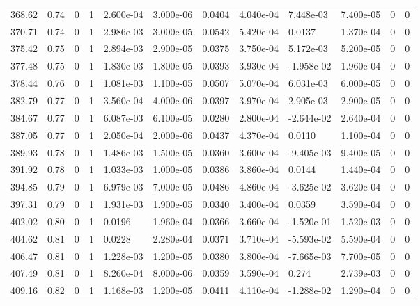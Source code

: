 \documentclass[preview]{standalone}
\begin{document}
{{{{{{{{{{{{{{{\begin{tabular}{L{1.2cm}C{1.2cm} C{0.3cm}C{0.5cm} C{1.4cm}C{1.4cm} C{1.4cm}C{1.4cm} C{1.6cm}C{1.6cm} C{1.6cm}C{1.6cm}}
  368.62  &  0.74  & 0     &  1 &  2.600e-04  & 3.000e-06  &  0.0404&   4.040e-04& 7.448e-03 & 7.400e-05   &  0 & 0  \\ 
  370.71  &  0.74  & 0     &  1 &  2.986e-03  & 3.000e-05  &  0.0542&   5.420e-04& 0.0137 & 1.370e-04   &  0 & 0  \\ 
  375.42  &  0.75  & 0     &  1 &  2.894e-03  & 2.900e-05  &  0.0375&   3.750e-04& 5.172e-03 & 5.200e-05   &  0 & 0  \\ 
  377.48  &  0.75  & 0     &  1 &  1.830e-03  & 1.800e-05  &  0.0393&   3.930e-04& -1.958e-02 & 1.960e-04   &  0 & 0  \\ 
  378.44  &  0.76  & 0     &  1 &  1.081e-03  & 1.100e-05  &  0.0507&   5.070e-04& 6.031e-03 & 6.000e-05   &  0 & 0  \\ 
  382.79  &  0.77  & 0     &  1 &  3.560e-04  & 4.000e-06  &  0.0397&   3.970e-04& 2.905e-03 & 2.900e-05   &  0 & 0  \\ 
  384.67  &  0.77  & 0     &  1 &  6.087e-03  & 6.100e-05  &  0.0280&   2.800e-04& -2.644e-02 & 2.640e-04   &  0 & 0  \\ 
  387.05  &  0.77  & 0     &  1 &  2.050e-04  & 2.000e-06  &  0.0437&   4.370e-04& 0.0110 & 1.100e-04   &  0 & 0  \\ 
  389.93  &  0.78  & 0     &  1 &  1.486e-03  & 1.500e-05  &  0.0360&   3.600e-04& -9.405e-03 & 9.400e-05   &  0 & 0  \\ 
  391.92  &  0.78  & 0     &  1 &  1.033e-03  & 1.000e-05  &  0.0386&   3.860e-04& 0.0144 & 1.440e-04   &  0 & 0  \\ 
  394.85  &  0.79  & 0     &  1 &  6.979e-03  & 7.000e-05  &  0.0486&   4.860e-04& -3.625e-02 & 3.620e-04   &  0 & 0  \\ 
  397.31  &  0.79  & 0     &  1 &  1.931e-03  & 1.900e-05  &  0.0340&   3.400e-04& 0.0359 & 3.590e-04   &  0 & 0  \\ 
  402.02  &  0.80  & 0     &  1 &  0.0196  & 1.960e-04  &  0.0366&   3.660e-04& -1.520e-01 & 1.520e-03   &  0 & 0  \\ 
  404.62  &  0.81  & 0     &  1 &  0.0228  & 2.280e-04  &  0.0371&   3.710e-04& -5.593e-02 & 5.590e-04   &  0 & 0  \\ 
  406.47  &  0.81  & 0     &  1 &  1.228e-03  & 1.200e-05  &  0.0380&   3.800e-04& -7.665e-03 & 7.700e-05   &  0 & 0  \\ 
  407.49  &  0.81  & 0     &  1 &  8.260e-04  & 8.000e-06  &  0.0359&   3.590e-04& 0.274 & 2.739e-03   &  0 & 0  \\ 
  409.16  &  0.82  & 0     &  1 &  1.168e-03  & 1.200e-05  &  0.0411&   4.110e-04& -1.288e-02 & 1.290e-04   &  0 & 0  \\ 

\end{tabular}}}}}}}}}}}}}}}}
\end{document}

